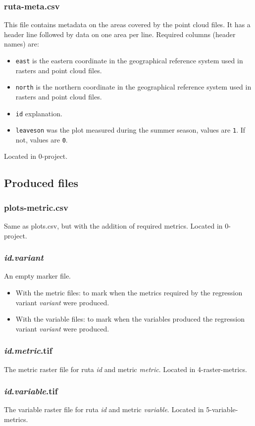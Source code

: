 \documentclass[english,a4paper,minion,nofigsidecaption]{article}
\newcommand{\file}[1]{\textsf{#1}}
\renewcommand{\tt}[1]{\texttt{#1}}
\newcommand{\id}{\emph{id}}
\begin{document}
\subsubsection{ruta-meta.csv}
This file contains metadata on the areas covered by the point cloud files. It has a header line followed by data on one area per line. Required columns (header names) are:
\begin{itemize}
	\item\tt{east} is the eastern coordinate in the geographical reference system used in rasters and point cloud files.
	\item\tt{north} is the northern coordinate in the geographical reference system used in rasters and point cloud files.
	\item\tt{id} explanation.
	\item\tt{leaveson} was the plot measured during the summer season, values are \tt{1}. If not, values are \tt{0}.
\end{itemize}
Located in \file{0-project}.


\subsection{Produced files}

\subsubsection{plots-metric.csv}
Same as plots.csv, but with the addition of required metrics. 
Located in \file{0-project}.

\subsubsection{{\id}.\emph{variant}}
An empty marker file. 
\begin{itemize}
	\item With the metric files: to mark when the metrics required by the regression variant \emph{variant} were produced.
	\item With the variable files: to mark when the variables produced the regression variant \emph{variant} were produced.
\end{itemize}

\subsubsection{{\id}.\emph{metric}.tif}
The metric raster file for ruta {\id} and metric \emph{metric}. 
Located in \file{4-raster-metrics}.

\subsubsection{{\id}.\emph{variable}.tif}
The variable raster file for ruta {\id} and metric \emph{variable}. 
Located in \file{5-variable-metrics}.
\end{document}
